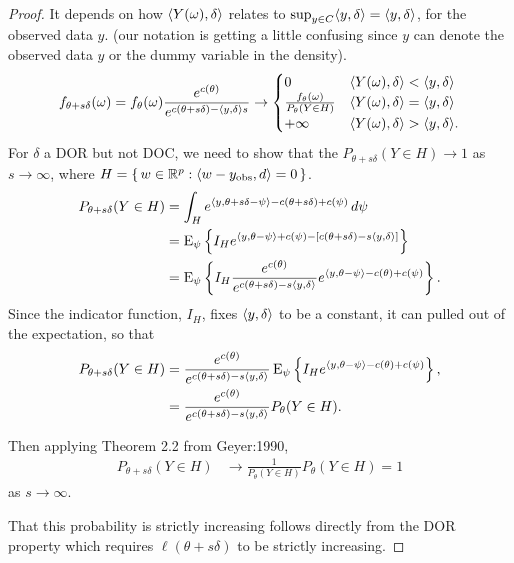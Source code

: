 \begin{proof}
It depends on how $\langle Y(\omega),\delta \rangle$ relates to $\sup_{y \in C}\langle y,
\delta \rangle = \langle y,\delta \rangle$, for the observed data $y$.  (our notation is getting a 
little confusing since $y$ can denote the observed data $y$ or the dummy variable in 
the density).  
\begin{align*}
	f_{\theta+s\delta}(\omega) = f_\theta(\omega) \frac{e^{c(\theta)}}{e^{ c(\theta+s
\delta) - \langle y,\delta \rangle s } } 
	\to	
			\begin{cases} 
			0 								& \langle Y(\omega),\delta \rangle < \langle y,
\delta \rangle \\
			\frac{f_\theta(\omega)}{P_\theta(Y \in H)} 	& \langle Y(\omega) ,
\delta \rangle = \langle y,\delta \rangle \\
			+\infty							& \langle Y(\omega),\delta \rangle > \langle y,
\delta \rangle.
	\end{cases}
\end{align*}
For $\delta$ a DOR but not DOC, we need to show that the $P_{\theta+s\delta}(Y \in H) 
\to 1$ 
as $s \to \infty$, where $H = \{\, w \in {\mathbb R}^p: \langle w-y_{\textrm{obs}},d \rangle=0 \,\}$.
\begin{align*}
 P_{\theta+s\delta}(Y \in H) &= \int_H e^{\langle y, \theta+s\delta - \psi \rangle - c(\theta
+s\delta) + c(\psi)} \, d\psi \\
		&= \operatorname{E}_\psi \left \{ I_H e^{\langle y, \theta - \psi \rangle +c(\psi) - [c(\theta+s
\delta) -s\langle y,\delta \rangle]} \right 
\}\\
		&= \operatorname{E}_\psi \left \{ I_H  \frac{e^{c(\theta)} }{ e^{ c(\theta+s\delta) -s\langle y,\delta \rangle } } 
		e^{\langle y, \theta - \psi \rangle -c(\theta)+c(\psi)}  \right \}.
\end{align*}
Since the indicator function, $I_H$, fixes $\langle  y, \delta \rangle$ to be a constant, it 
can pulled out of the expectation, so that 
\begin{align*}
		 P_{\theta+s\delta}(Y \in H)
		 &= \frac{e^{c(\theta)} }{ e^{ c(\theta+s\delta) -s\langle y,\delta \rangle } }
		 \operatorname{E}_\psi \left \{ I_H   
		e^{\langle y, \theta - \psi \rangle -c(\theta)+c(\psi)}  \right \}, \\
		 &= \frac{e^{c(\theta)} }{ e^{ c(\theta+s\delta) -s\langle y,\delta \rangle } } 
		 P_\theta ( Y \in H ).
		 \end{align*}
 
Then applying Theorem 2.2 from Geyer:1990,
\begin{align*}
 P_{\theta+s\delta}(Y \in H)
		&\to \frac{1}{P_\theta(Y \in H)}  P_{\theta}(Y \in H) = 1
 \end{align*}
 as $s \to \infty$.  
 
 That this probability is strictly increasing follows directly from the DOR property 
which requires $\ell( \theta+s
\delta)$ to be strictly increasing.   
\end{proof}

